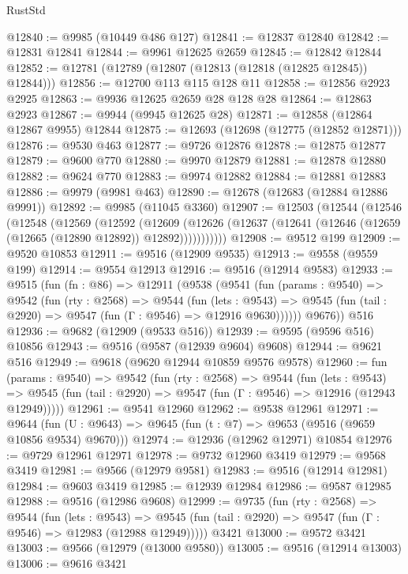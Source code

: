 \begin{lexlean}{RustStd}
\begin{coremodule}
@12840 := @9985 (@10449 @486 @127)
@12841 := @12837 @12840
@12842 := @12831 @12841
@12844 := @9961 @12625 @2659
@12845 := @12842 @12844
@12852 := @12781 (@12789 (@12807 (@12813 (@12818 (@12825 @12845)) @12844)))
@12856 := @12700 @113 @115 @128 @11
@12858 := @12856 @2923 @2925
@12863 := @9936 @12625 @2659 @28 @128 @28
@12864 := @12863 @2923
@12867 := @9944 (@9945 @12625 @28)
@12871 := @12858 (@12864 @12867 @9955) @12844
@12875 := @12693 (@12698 (@12775 (@12852 @12871)))
@12876 := @9530 @463
@12877 := @9726 @12876
@12878 := @12875 @12877
@12879 := @9600 @770
@12880 := @9970 @12879
@12881 := @12878 @12880
@12882 := @9624 @770
@12883 := @9974 @12882
@12884 := @12881 @12883
@12886 := @9979 (@9981 @463)
@12890 := @12678 (@12683 (@12884 @12886 @9991))
@12892 := @9985 (@11045 @3360)
@12907 := @12503
    (@12544
      (@12546
        (@12548
          (@12569
            (@12592
              (@12609
                (@12626 (@12637 (@12641 (@12646 (@12659 (@12665 (@12890 @12892)) @12892)))))))))))
@12908 := @9512 @199
@12909 := @9520 @10853
@12911 := @9516 (@12909 @9535)
@12913 := @9558 (@9559 @199)
@12914 := @9554 @12913
@12916 := @9516 (@12914 @9583)
@12933 := @9515
    (fun (fn : @86) =>
    @12911
      (@9538
        (@9541
          (fun (params : @9540) =>
          @9542
            (fun (rty : @2568) =>
            @9544
              (fun (lets : @9543) =>
              @9545 (fun (tail : @2920) => @9547 (fun (Γ : @9546) => @12916 @9630))))))
        @9676))
    @516
@12936 := @9682 (@12909 (@9533 @516))
@12939 := @9595 (@9596 @516) @10856
@12943 := @9516 (@9587 (@12939 @9604) @9608)
@12944 := @9621 @516
@12949 := @9618 (@9620 @12944 @10859 @9576 @9578)
@12960 := fun (params : @9540) =>
  @9542
    (fun (rty : @2568) =>
    @9544
      (fun (lets : @9543) =>
      @9545 (fun (tail : @2920) => @9547 (fun (Γ : @9546) => @12916 (@12943 @12949)))))
@12961 := @9541 @12960
@12962 := @9538 @12961
@12971 := @9644
    (fun (U : @9643) => @9645 (fun (t : @7) => @9653 (@9516 (@9659 @10856 @9534) @9670)))
@12974 := @12936 (@12962 @12971) @10854
@12976 := @9729 @12961 @12971
@12978 := @9732 @12960 @3419
@12979 := @9568 @3419
@12981 := @9566 (@12979 @9581)
@12983 := @9516 (@12914 @12981)
@12984 := @9603 @3419
@12985 := @12939 @12984
@12986 := @9587 @12985
@12988 := @9516 (@12986 @9608)
@12999 := @9735
    (fun (rty : @2568) =>
    @9544
      (fun (lets : @9543) =>
      @9545 (fun (tail : @2920) => @9547 (fun (Γ : @9546) => @12983 (@12988 @12949)))))
    @3421
@13000 := @9572 @3421
@13003 := @9566 (@12979 (@13000 @9580))
@13005 := @9516 (@12914 @13003)
@13006 := @9616 @3421

\end{coremodule}
\end{lexlean}
